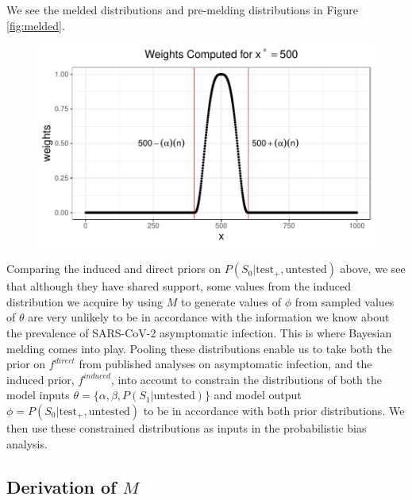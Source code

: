 \documentclass[12pt,twoside]{smiththesis}
\begin{document}
We see the melded distributions and pre-melding distributions in Figure \ref{fig:melded}.
\begin{figure}

{\centering \includegraphics[width=1\linewidth]{thesis_files/figure-latex/unnamed-chunk-20-1} 

}

\caption{\label{fig:melded}}\label{fig:unnamed-chunk-20}
\end{figure}
Comparing the induced and direct priors on \(P(S_0| \text{test}_+, \text{untested})\) above, we see that although they have shared support, some values from the induced distribution we acquire by using \(M\) to generate values of \(\phi\) from sampled values of \(\theta\) are very unlikely to be in accordance with the information we know about the prevalence of SARS-CoV-2 asymptomatic infection. This is where Bayesian melding comes into play. Pooling these distributions enable us to take both the prior on \(f^{direct}\) from published analyses on asymptomatic infection, and the induced prior, \(f^{induced}\), into account to constrain the distributions of both the model inputs \(\theta = \{ \alpha, \beta, P(S_1 | \text{untested})\}\) and model output \(\phi = P(S_0|\text{test}_+, \text{untested})\) to be in accordance with both prior distributions. We then use these constrained distributions as inputs in the probabilistic bias analysis.

\newpage

\hypertarget{derivation}{%
\subsection{\texorpdfstring{Derivation of \(M\)}{Derivation of M}}\label{derivation}}
\end{document}
